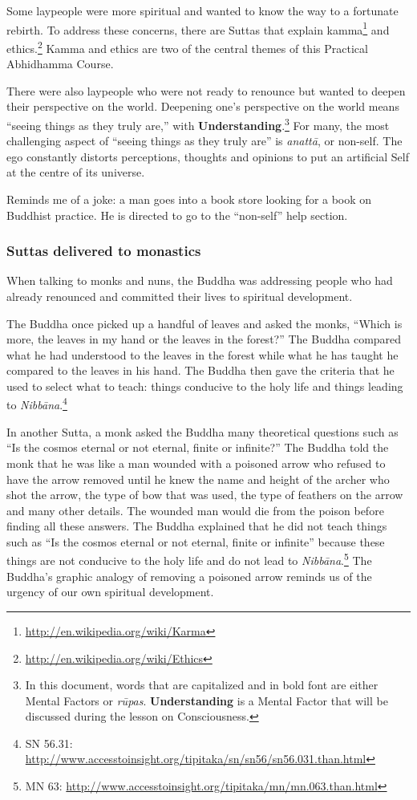 \pagebreak

Some laypeople were more spiritual and wanted to know the way to a fortunate rebirth. To address these concerns, there are Suttas that explain kamma\footnote{\url{http://en.wikipedia.org/wiki/Karma}} and ethics.\footnote{\url{http://en.wikipedia.org/wiki/Ethics}} Kamma and ethics are two of the central themes of this Practical Abhidhamma Course.

There were also laypeople who were not ready to renounce but wanted to deepen their perspective on the world. Deepening one’s perspective on the world means “seeing things as they truly are,” with \textbf{Understanding}.\footnote{In this document, words that are capitalized and in bold font are either Mental Factors or \textit{rūpas}. \textbf{Understanding} is a Mental Factor that will be discussed during the lesson on Consciousness.} For many, the most challenging aspect of “seeing things as they truly are” is \textit{anattā}, or non-self. The ego constantly distorts perceptions, thoughts and opinions to put an artificial Self at the centre of its universe. 

Reminds me of a joke: a man goes into a book store looking for a book on Buddhist practice. He is directed to go to the “non-self” help section.

\subsubsection*{Suttas delivered to monastics}

When talking to monks and nuns, the Buddha was addressing people who had already renounced and committed their lives to spiritual development.

The Buddha once picked up a handful of leaves and asked the monks, “Which is more, the leaves in my hand or the leaves in the forest?” The Buddha compared what he had understood to the leaves in the forest while what he has taught he compared to the leaves in his hand. The Buddha then gave the criteria that he used to select what to teach: things conducive to the holy life and things leading to \textit{Nibbāna}.\footnote{SN 56.31: \url{http://www.accesstoinsight.org/tipitaka/sn/sn56/sn56.031.than.html}}

In another Sutta, a monk asked the Buddha many theoretical questions such as “Is the cosmos eternal or not eternal, finite or infinite?” The Buddha told the monk that he was like a man wounded with a poisoned arrow who refused to have the arrow removed until he knew the name and height of the archer who shot the arrow, the type of bow that was used, the type of feathers on the arrow and many other details. The wounded man would die from the poison before finding all these answers. The Buddha explained that he did not teach things such as “Is the cosmos eternal or not eternal, finite or infinite” because these things are not conducive to the holy life and do not lead to \textit{Nibbāna}.\footnote{MN 63: \url{http://www.accesstoinsight.org/tipitaka/mn/mn.063.than.html}} The Buddha’s graphic analogy of removing a poisoned arrow reminds us of the urgency of our own spiritual development.

